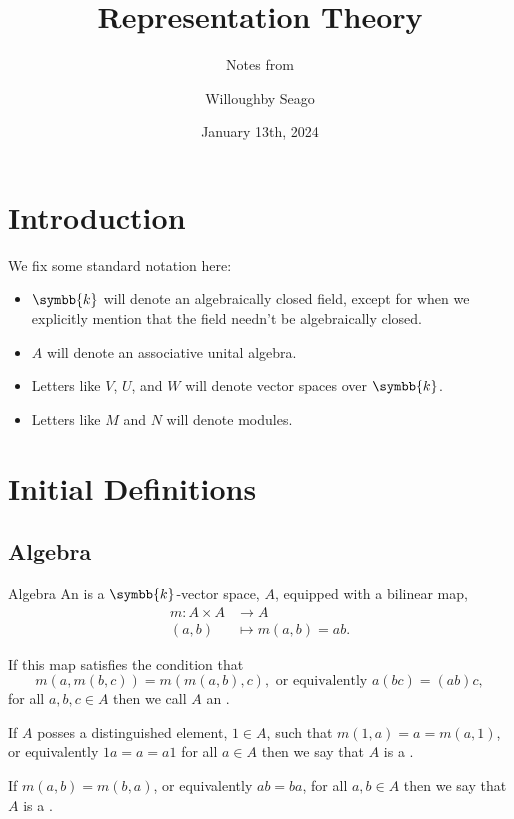 \documentclass[fleqn]{NotesClass}
\title{Representation Theory}
\author{Willoughby Seago}
\date{January 13th, 2024}
\subtitle{Notes from}
\renewcommand{\field}{\symbb{k}}
\begin{document}
    \frontmatter
    \titlepage
    \innertitlepage{}
    \tableofcontents
    \mainmatter
    \chapter{Introduction}
    We fix some standard notation here:
    \begin{itemize}
        \item \(\field\) will denote an algebraically closed field, except for when we explicitly mention that the field needn't be algebraically closed.
        \item \(A\) will denote an associative unital algebra.
        \item Letters like \(V\), \(U\), and \(W\) will denote vector spaces over \(\field\).
        \item Letters like \(M\) and \(N\) will denote modules.
    \end{itemize}
    
    \chapter{Initial Definitions}
    \section{Algebra}
    \begin{dfn}{Algebra}{}
        An  is a \(\field\)-vector space, \(A\), equipped with a bilinear map,
        \begin{align}
            m \colon A \times A &\to A\\
            (a, b) &\mapsto m(a, b) = ab.
        \end{align}
        
        If this map satisfies the condition that
        \begin{equation}
            m(a, m(b, c)) = m(m(a, b), c), \text{ or equivalently } a(bc) = (ab)c,
        \end{equation}
        for all \(a, b, c \in A\) then we call \(A\) an .
        
        If \(A\) posses a distinguished element, \(1 \in A\), such that \(m(1, a) = a = m(a, 1)\), or equivalently \(1a = a = a1\) for all \(a \in A\) then we say that \(A\) is a .
        
        If \(m(a, b) = m(b, a)\), or equivalently \(ab = ba\), for all \(a, b \in A\) then we say that \(A\) is a .
    \end{dfn}
    
\end{document}
